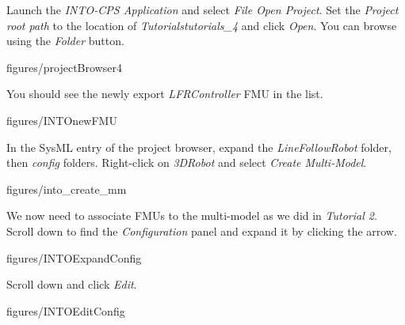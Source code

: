\documentclass[11pt,a4paper]{../tutorial}
\begin{document}
\begin{instructions}
\item Launch the \emph{INTO-CPS Application} and select \emph{File \menusep Open Project}. Set the \emph{Project root path} to the location of \emph{Tutorials\pathsep{}tutorials\_4} and click \emph{Open}. You can browse using the \emph{Folder} button.

    \begin{annotation}[width=0.35\linewidth,trim=0 0 0 0,clip]{figures/projectBrowser4}
    \end{annotation}

    You should see the newly export \emph{LFRController} FMU in the list.

    \begin{annotation}[height=0.5\linewidth,trim=0 125 250 0,clip]{figures/INTOnewFMU}
    \end{annotation}

\item In the SysML entry of the project browser, expand the \emph{LineFollowRobot} folder, then \emph{config} folders. Right-click on \emph{3DRobot} and select \emph{Create Multi-Model}.

    \begin{annotation}[width=0.35\linewidth,trim=0 40 375 300,clip]{figures/into_create_mm}
    \end{annotation}

\newpage
\item We now need to associate FMUs to the multi-model as we did in \emph{Tutorial 2}. Scroll down to find the \emph{Configuration} panel and expand it by clicking the arrow.

    \begin{annotation}[width=0.85\linewidth,trim=0 0 0 250,clip]{figures/INTOExpandConfig}
    \end{annotation}

\item Scroll down and click \emph{Edit}.

    \begin{annotation}[width=0.85\linewidth,trim=0 0 0 260,clip]{figures/INTOEditConfig}
    \end{annotation}


\end{instructions}
\end{document}
